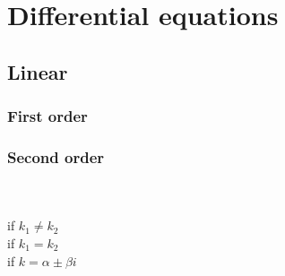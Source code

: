 \documentclass[12pt, a4paper]{article}
\begin{document}
    
    \maketitle

    \newpage

    \tableofcontents

    \newpage

    \section{Differential equations}

    
    
    \subsection{Linear}

    \subsubsection{First order}

    

    \subsubsection{Second order}

    
    \\ \\
    
    if $k_1 \not= k_2$ \\
    
    if $k_1 = k_2$ \\
    
    if $k = \alpha \pm \beta i$
\end{document}
